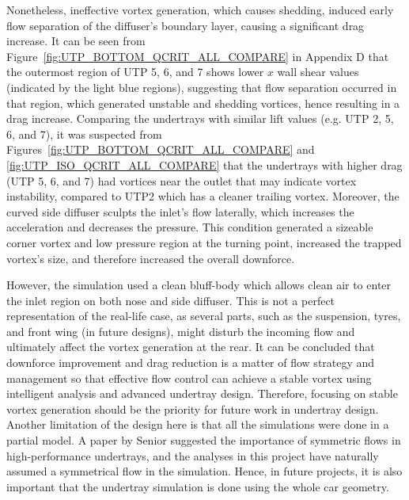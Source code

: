 \noindent Nonetheless, ineffective vortex generation, which causes shedding, induced early flow separation of the diffuser's boundary layer, causing a significant drag increase. It can be seen from Figure~\ref{fig:UTP_BOTTOM_QCRIT_ALL_COMPARE} in Appendix D that the outermost region of UTP 5, 6, and 7 shows lower $x$ wall shear values (indicated by the light blue regions), suggesting that flow separation occurred in that region, which generated unstable and shedding vortices, hence resulting in a drag increase. Comparing the undertrays with similar lift values (e.g. UTP 2, 5, 6, and 7), it was suspected from Figures~\ref{fig:UTP_BOTTOM_QCRIT_ALL_COMPARE} and \ref{fig:UTP_ISO_QCRIT_ALL_COMPARE} that the undertrays with higher drag (UTP 5, 6, and 7) had vortices near the outlet that may indicate vortex instability, compared to UTP2 which has a cleaner trailing vortex. Moreover, the curved side diffuser sculpts the inlet's flow laterally, which increases the acceleration and decreases the pressure. This condition generated a sizeable corner vortex and low pressure region at the turning point, increased the trapped vortex's size, and therefore increased the overall downforce.

\noindent However, the simulation used a clean bluff-body which allows clean air to enter the inlet region on both nose and side diffuser. This is not a perfect representation of the real-life case, as several parts, such as the suspension, tyres, and front wing (in future designs), might disturb the incoming flow and ultimately affect the vortex generation at the rear. It can be concluded that downforce improvement and drag reduction is a matter of flow strategy and management so that effective flow control can achieve a stable vortex using intelligent analysis and advanced undertray design. Therefore, focusing on stable vortex generation should be the priority for future work in undertray design. Another limitation of the design here is that all the simulations were done in a partial model. A paper by Senior \cite{Senior2001TheEffect} suggested the importance of symmetric flows in high-performance undertrays, and the analyses in this project have naturally assumed a symmetrical flow in the simulation. Hence, in future projects, it is also important that the undertray simulation is done using the whole car geometry.
















